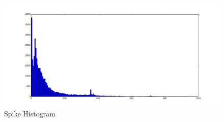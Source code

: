 \begin{figure}
	\centering
	\includegraphics[width=0.7\linewidth]{images/freq_histogram}
	\caption[Spike Histogram]{Spike Histogram}
	\label{fig:freq_histogram}
\end{figure}
